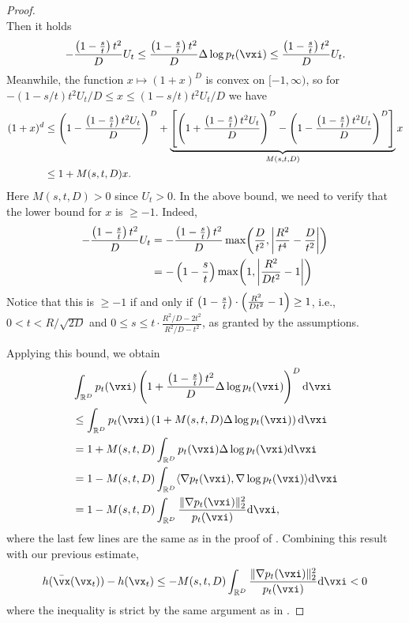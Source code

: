 \documentclass[../../book-main.tex]{subfiles}
\begin{document}
\begin{proof}
\begin{equation}
    \end{equation}
    Then it holds
    \begin{equation}
        -\frac{\bp{1 - \frac{s}{t}}t^{2}}{D}U_{t} \leq \frac{\bp{1 - \frac{s}{t}}t^{2}}{D}\Delta \log p_{t}(\vxi) \leq \frac{\bp{1 - \frac{s}{t}}t^{2}}{D}U_{t}.
    \end{equation}
    Meanwhile, the function \(x \mapsto (1 + x)^{D}\) is convex on \([-1, \infty)\), so for
    \(-(1-s/t)t^{2}U_{t}/D \leq x \leq (1-s/t)t^{2}U_{t}/D\) we have 
    \begin{align}
        (1 + x)^{d} 
        &\leq \left(1 - \frac{\left(1 - \frac{s}{t}\right)t^{2}U_{t}}{D}\right)^{D} + \underbrace{\left[\left(1 + \frac{\left(1 - \frac{s}{t}\right)t^{2}U_{t}}{D}\right)^{D} - \left(1 - \frac{\left(1 - \frac{s}{t}\right)t^{2}U_{t}}{D}\right)^{D}\right]}_{M(s, t, D)}x \\ 
        &\leq 1 + M(s, t, D)x.
    \end{align}
    Here \(M(s, t, D) > 0\) since \(U_{t} > 0\). In the above bound, we need to verify that the lower bound for \(x\) is \(\geq -1\). Indeed,
    \begin{align}
        -\frac{\bp{1 - \frac{s}{t}}t^{2}}{D}U_{t}
        &= -\frac{\bp{1 - \frac{s}{t}}t^{2}}{D}\max\rp{\frac{D}{t^{2}}, \abs*{\frac{R^{2}}{t^{4}} - \frac{D}{t^{2}}}} \\ 
        &= -\bp{1 - \frac{s}{t}}\max\rp{1, \abs*{\frac{R^{2}}{Dt^{2}} - 1}}
    \end{align}
    Notice that this is \(\geq -1\) if and only if \(\left(1 - \frac{s}{t}\right)\cdot\left(\frac{R^{2}}{Dt^{2}} - 1\right) \geq 1\), i.e., \(0 < t < R/\sqrt{2D}\) and \(0 \leq s \leq t\cdot\frac{R^{2}/D - 2t^{2}}{R^{2}/D - t^{2}}\), as granted by the assumptions.
    
    Applying this bound, we obtain
    \begin{align}
        &\int_{\R^{D}} p_{t}(\vxi)\bp{1 + \frac{\bp{1 - \frac{s}{t}}t^{2}}{D}\Delta \log p_{t}(\vxi)}^{D}\odif{\vxi} \\ 
        &\leq \int_{\R^{D}}p_{t}(\vxi)\bp{1 + M(s, t, D)\Delta \log p_{t}(\vxi)}\odif{\vxi} \\
        &= 1 + M(s, t, D)\int_{\R^{D}}p_{t}(\vxi)\Delta \log p_{t}(\vxi)\odif{\vxi} \\
        &= 1 - M(s, t, D)\int_{\R^{D}}\ip{\nabla p_{t}(\vxi)}{\nabla\log p_{t}(\vxi)}\odif{\vxi} \\
        &= 1 - M(s, t, D)\int_{\R^{D}}\frac{\norm{\nabla p_{t}(\vxi)}_{2}^{2}}{p_{t}(\vxi)}\odif{\vxi},
    \end{align}
    where the last few lines are the same as in the proof of . Combining this result with our previous estimate,
    \begin{equation}
        h(\bar{\vx}(\vx_{t})) - h(\vx_{t}) \leq - M(s, t, D)\int_{\R^{D}}\frac{\norm{\nabla p_{t}(\vxi)}_{2}^{2}}{p_{t}(\vxi)}\odif{\vxi} < 0
    \end{equation}
    where the inequality is strict by the same argument as in .
\end{proof}
\end{document}
